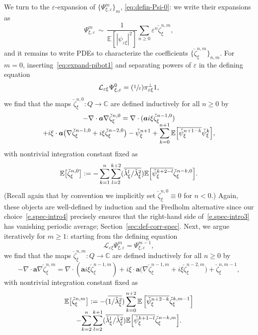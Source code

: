 \documentclass[10pt]{amsart}
\newcommand{\Psfrac}[2]{(\sfrac{#1}{#2})}
\theoremstyle{plain}
\theoremstyle{definition}
\numberwithin{equation}{section}
\newcommand{\e}{\varepsilon}
\newcommand{\Lc}{\mathcal{L}}
\newcommand{\C}{\mathbb C}
\newcommand{\Aa}{\boldsymbol a}
\newcommand{\expec}[1]{\mathbb{E}\left[ #1 \right]}
\newcommand{\Bexpec}[1]{\mathbb{E}\Bigl[ #1 \Bigr]}
\newcommand{\expecm}[1]{\mathbb{E}\bigl[ #1 \bigr]}\let\bexpec\expecm
\begin{document}
We turn to the $\e$-expansion of $\{\Psi_{\xi,\e}^m\}_m$, \cf \eqref{eq:defin-Psi-0}: we write their expansions as
\begin{equation}\label{eq:expand-Psixieps}
\Psi_{\xi,\e}^m\,\sim\,\frac1{\expec{|\psi_{\e\xi}|^2}}\sum_{n\ge0}\e^n\check\zeta_\xi^{n,m},
\end{equation}
and it remains to write PDEs to characterize the coefficients $\{\check\zeta_\xi^{n,m}\}_{n,m}$.
For $m=0$, inserting~\eqref{eq:expand-pibot1} and separating powers of $\e$ in the defining equation
\begin{equation*}
\Lc_{\e\xi} \Psi_{\xi,\e}^0=\Psfrac1\e\pi_{\e\xi}^\bot1,
\end{equation*}
we find that the maps $\check\zeta_\xi^{n,0}:Q\to\C$ are defined inductively for all $n\ge0$ by
\begin{multline}\label{e.spec-intro3}
-\nabla\cdot\Aa\nabla\check\zeta^{n,0}_\xi=\nabla\cdot(\Aa i\xi\check\zeta^{n-1,0}_\xi)\\[-5pt]+i\xi\cdot\Aa\big(\nabla\check\zeta^{n-1,0}_\xi+i\xi\check\zeta^{n-2,0}_\xi\big)-\check\psi^{n+1}_\xi+\sum_{k=0}^{n+1}\Bexpec{\overline{\check\psi^{n+1-k}_\xi}\check\psi^k_\xi},
\end{multline}
with nontrivial integration constant fixed as
\begin{equation}\label{e.spec-intro4}
\expecm{\check\zeta^{n,0}_\xi}:=-\sum_{k=1}^{n}\sum_{l=2}^{k+2}(\overline{\check\lambda^l_\xi/\check\lambda^2_\xi})\Bexpec{\overline{\check\psi^{k+2-l}_\xi} \check\zeta^{n-k,0}_\xi}.
\end{equation}
(Recall again that by convention we implicitly set $\check\zeta_\xi^{n,0}\equiv0$ for $n<0$.)
Again, these objects are well-defined by induction and the Fredholm alternative since our choice~\eqref{e.spec-intro4} precisely ensures that the right-hand side of~\eqref{e.spec-intro3} has vanishing periodic average; \cf Section~\ref{sec:def-corr-spec}.
Next, we argue iteratively for $m\ge1$:
starting from the defining equation
\[\Lc_{\e\xi}\Psi_{\xi,\e}^{m}= \Psi_{\xi,\e}^{m-1},\]
we find that the maps $\check\zeta_\xi^{n,m}:Q\to\C$ are defined inductively for all $n\ge0$ by
\begin{equation}\label{e.spec-intro4re}
-\nabla\cdot\Aa\nabla\check\zeta^{n,m}_\xi=\nabla\cdot(\Aa i\xi\check\zeta^{n-1,m}_\xi)+i\xi\cdot\Aa\big(\nabla\check\zeta^{n-1,m}_\xi+i\xi\check\zeta^{n-2,m}_\xi\big)+\check\zeta^{n,m-1}_\xi,
\end{equation}
with nontrivial integration constant fixed as
\begin{multline}\label{e.spec-intro5re}
\expecm{\check\zeta^{n,m}_\xi}:=-(\overline{1/\check\lambda^2_\xi})\sum_{k=0}^{n+2}\expec{\overline{\check\psi^{n+2-k}_\xi }\check\zeta^{k,m-1}_\xi}\\[-8pt]
-{\sum_{k=2}^{n}}\sum_{l=2}^{k+1}(\overline{\check\lambda^l_\xi/\check\lambda^2_\xi})\Bexpec{\overline{\check\psi^{k+1-l}_\xi }\check\zeta^{n-k,m}_\xi}.
\end{multline}
\end{document}
